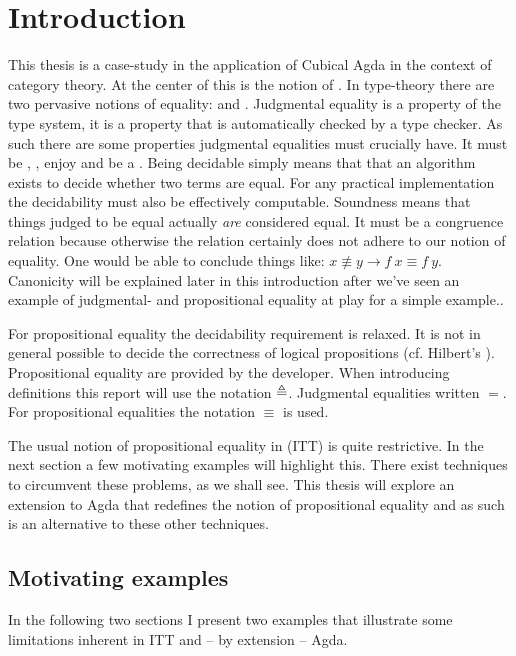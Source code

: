 \chapter{Introduction}
This thesis is a case-study in the application of Cubical Agda in the
context of category theory. At the center of this is the notion of
. In type-theory there are two pervasive notions
of equality:  and
. Judgmental equality is a property
of the type system, it is a property that is automatically checked by
a type checker. As such there are some properties judgmental
equalities must crucially have. It must be ,
, enjoy  and be a
. Being decidable simply means that that an
algorithm exists to decide whether two terms are equal. For any
practical implementation the decidability must also be effectively
computable. Soundness means that things judged to be equal actually
\emph{are} considered equal. It must be a congruence relation because
otherwise the relation certainly does not adhere to our notion of
equality. One would be able to conclude things like: $x \nequiv y
\rightarrow f\ x \equiv f\ y$. Canonicity will be explained later in
this introduction after we've seen an example of judgmental- and
propositional equality at play for a simple example..

For propositional equality the decidability requirement is relaxed. It
is not in general possible to decide the correctness of logical
propositions (cf. Hilbert's ).
Propositional equality are provided by the developer. When introducing
definitions this report will use the notation $\mathrel{\triangleq}$. Judgmental
equalities written $=$. For propositional equalities the notation
$\equiv$ is used.

The usual notion of propositional equality in  (ITT) is quite restrictive. In the next section a few
motivating examples will highlight this. There exist techniques to
circumvent these problems, as we shall see. This thesis will explore
an extension to Agda that redefines the notion of propositional
equality and as such is an alternative to these other techniques.
%
\section{Motivating examples}
%
In the following two sections I present two examples that illustrate
some limitations inherent in ITT and -- by extension -- Agda.
%
